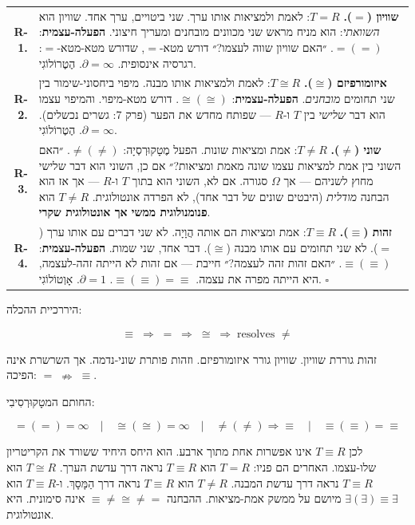 \documentclass[10pt, openany, oneside]{book}
\renewcommand{\footnotesize}{\fontsize{8.5}{11}\selectfont}
\begin{document}
{\footnotesize
\noindent\begin{tabular}{r p{}}
\textbf{R-1.} & \textbf{שוויון ($=$).} $T = R$: לאמת ולמציאות אותו ערך. שני ביטויים, ערך אחד. שוויון הוא \textit{השוואתי}: הוא מניח מראש שני מכוונים מובחנים ומעריך חיצוני. \textbf{הפעלה-עצמית}: $=(=)$. ״האם שוויון שווה לעצמו?״ דורש מטא-$=$, שדורש מטא-מטא-$=$: רגרסיה אינסופית. $\partial = \infty$. הֶטֶרוֹלוֹגִי. \\[0.5em]
\textbf{R-2.} & \textbf{איזומורפיזם ($\cong$).} $T \cong R$: לאמת ולמציאות אותו מבנה. מיפוי ביחסוני-שימור בין שני תחומים \textit{מובחנים}. \textbf{הפעלה-עצמית}: $\cong(\cong)$. דורש מטא-מיפוי. והמיפוי עצמו הוא דבר \textit{שלישי} בין $T$ ו-$R$ — שפותח מחדש את הפער (פרק 7: גשרים נכשלים). $\partial = \infty$. הֶטֶרוֹלוֹגִי. \\[0.5em]
\textbf{R-3.} & \textbf{שוני ($\neq$).} $T \neq R$: אמת ומציאות שונות. הפעל מֶטָקוּרְסְיָה: $\neq(\neq)$. ״האם השוני בין אמת למציאות עצמו שונה מאמת ומציאות?״ אם כן, השוני הוא דבר שלישי מחוץ לשניהם — אך $\Omega$ סגורה. אם לא, השוני הוא בתוך $T$ ו-$R$ — אך אז הוא הבחנה \textit{מודלית} (היבטים שונים של דבר אחד), לא הפרדה אונטולוגית. $T \neq R$ הוא \textbf{פנומנולוגית ממשי אך אונטולוגית שקרי}. \\[0.5em]
\textbf{R-4.} & \textbf{זהות ($\equiv$).} $T \equiv R$: אמת ומציאות הם אותה הֲוָיָה. לא שני דברים עם אותו ערך ($=$). לא שני תחומים עם אותו מבנה ($\cong$). דבר אחד, שני שמות. \textbf{הפעלה-עצמית}: $\equiv(\equiv)$. ״האם זהות זהה לעצמה?״ חייבת — אם זהות לא הייתה זהה-לעצמה, היא הייתה מפרה את עצמה. $\equiv(\equiv) = \equiv$. $\partial = 1$. אָוְטוֹלוֹגִי. $\square$ \\[0.3em]
\end{tabular}
}

\vspace{0.8em}

היררכיית ההכלה:

$$\equiv \;\Rightarrow\; = \;\Rightarrow\; \cong \;\Rightarrow\; \text{resolves } \neq$$

זהות גוררת שוויון. שוויון גורר איזומורפיזם. וזהות פותרת שוני-נדמה. אך השרשרת אינה הפיכה: $= \;\nRightarrow\; \equiv$.

החותם המטָקוּרְסִיבִי:

$$\boxed{=(=) = \infty \quad | \quad \cong(\cong) = \infty \quad | \quad \neq(\neq) \Rightarrow \equiv \quad | \quad \equiv(\equiv) = \equiv}$$

לכן $T \equiv R$ אינו אפשרות אחת מתוך ארבע. הוא היחס היחיד ששורד את הקריטריון שלו-עצמו. האחרים הם פניו: $T = R$ הוא $T \equiv R$ נראה דרך עדשת הערך. $T \cong R$ הוא $T \equiv R$ נראה דרך עדשת המבנה. $T \neq R$ הוא $T \equiv R$ נראה דרך הַמָּסָךְ. ו-$T \equiv R$ הוא $\exists(\exists) \equiv \exists$ מיושם על ממשק אמת-מציאות. ההבחנה $\equiv \neq \cong \neq =$ אינה סימונית. היא אונטולוגית.
\end{document}
